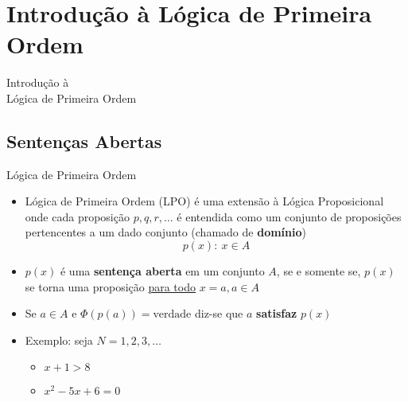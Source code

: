 \section{Introdução à Lógica de Primeira Ordem} %

\begin{frame}[t]
\vskip 3cm
\begin{center}
{\Huge Introdução à\\Lógica de Primeira Ordem}
\end{center}
\end{frame}

\subsection{Sentenças Abertas}

\begin{frame}[t]{Lógica de Primeira Ordem}
	\begin{itemize} \itemsep 0.4cm
	\item Lógica de Primeira Ordem (LPO) é uma extensão à Lógica Proposicional onde cada proposição $p, q, r, \ldots$ é entendida como um conjunto de proposições pertencentes a um dado conjunto (chamado de {\bf domínio}) $$p(x):~ x \in A$$

	\item $p(x)$ é uma {\bf sentença aberta} em um conjunto $A$, se e somente se, $p(x)$ se torna uma proposição \underline{para todo} $x=a, a \in A$

	\item Se $a \in A$ e $\Phi(p(a)) = \mbox{verdade}$ diz-se que $a$ {\bf satisfaz} $p(x)$

	\item Exemplo: seja $N = 1, 2, 3, \ldots$
	\begin{itemize}
	\item $x + 1 > 8$
	\item $x^2 - 5x + 6 = 0$
	\end{itemize}
	\end{itemize}
\end{frame}

